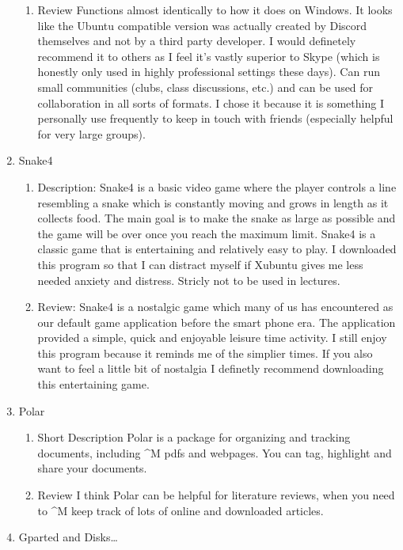 \documentclass{article}
\begin{document}
\begin{enumerate}
\begin{enumerate}
\item Review
\label{sec:org0f79037}
Functions almost identically to how it does on Windows. It looks like the Ubuntu compatible version was actually created by Discord themselves and not by a third party developer. I would definetely recommend it to others as I feel it's vastly superior to Skype (which is honestly only used in highly professional settings these days). Can run small communities (clubs, class discussions, etc.) and can be used for collaboration in all sorts of formats. I chose it because it is something I personally use frequently to keep in touch with friends (especially helpful for very large groups).
\end{enumerate}
\item Snake4
\label{sec:org8a88c2d}
\begin{enumerate}
\item Description:
\label{sec:org7089249}
Snake4 is a basic video game where the player controls a line resembling a snake which is constantly moving and grows in length as it collects food. The main goal is to make the snake as large as possible and the game will be over once you reach the maximum limit. Snake4 is a classic game that is entertaining and relatively easy to play. I downloaded this program so that I can distract myself if Xubuntu gives me less needed anxiety and distress. Stricly not to be used in lectures.
\item Review:
\label{sec:org0e4f109}
Snake4 is a nostalgic game which many of us has encountered as our default game application before the smart phone era. The application provided a simple, quick and enjoyable leisure time activity. I still enjoy this program because it reminds me of the simplier times. If you also want to feel a little bit of nostalgia I definetly recommend downloading this entertaining game.
\end{enumerate}
\item Polar
\label{sec:org0299eb2}
\begin{enumerate}
\item Short Description
\label{sec:org586880a}
      Polar is a package for organizing and tracking documents, including \^{}M
pdfs and webpages. You can tag, highlight and share your documents.
\item Review
\label{sec:org19c6bce}
      I think Polar can be helpful for literature reviews, when you need to \^{}M
keep track of lots of online and downloaded articles.
\end{enumerate}
\item Gparted and Disks\ldots{}

\end{enumerate}
\end{document}
